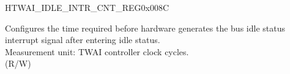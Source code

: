 \begin{register}{H}{TWAI\_IDLE\_INTR\_CNT\_REG}{0x008C}\label{regdesc:TWAIIDLEINTRCNTREG}
%
\regnewline%
\begin{regdesc}\begin{reglist}
\label{fielddesc:TWAIIDLEINTRCNT}\item [TWAI\_IDLE\_INTR\_CNT] Configures the time required before hardware generates the bus idle status interrupt signal after entering idle status.\\
Measurement unit: TWAI controller clock cycles.\\
(R/W)
\end{reglist}\end{regdesc}
\end{register}


